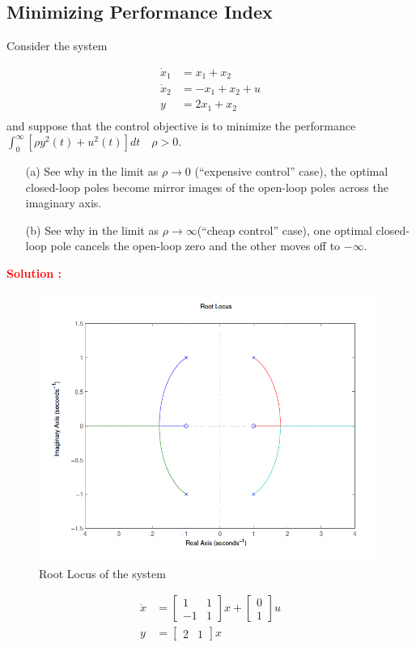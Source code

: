 \documentclass[12pt]{article}
\newcommand{\bmat}[1]{\begin{bmatrix} #1 \end{bmatrix}}
\begin{document}
\subsection{Minimizing Performance Index}

Consider the system

\begin{equation}
\begin{split}
    \dot{x}_1 &= x_1 + x_2 \\
    \dot{x}_2 &= - x_1 + x_2 + u \\
    y &= 2x_1 + x_2  \\
\end{split}
\end{equation}
and suppose that the control objective is to minimize the performance $ \int_0^\infty [\rho y^2(t) + u^2(t)]dt \quad  \rho> 0$.
\begin{itemize}
    \item [(a)] See why in the limit as $\rho \rightarrow 0$ (“expensive control” case), the optimal closed-loop poles become mirror images of the open-loop poles across the imaginary axis.
    \item [(b)] See why in the limit as  $\rho \rightarrow \infty$(“cheap control” case), one optimal closed-loop pole cancels the open-loop zero and the other moves off to $-\infty$.
\end{itemize}
\textbf{\textcolor{red}{Solution :}} \\

\begin{figure}[H]
    \centering
    \includegraphics[width=0.5\linewidth]{figs/7.3.png}
    \caption{Root Locus of the system}
    \label{fig:prb18}
\end{figure}

\begin{equation*}
    \begin{split}
        \dot{x} &=\bmat{1 & 1\\ -1 &1} x +\bmat{0\\1}u \\
        y&=\bmat{2 & 1}x
    \end{split}
\end{equation*}
\end{document}
